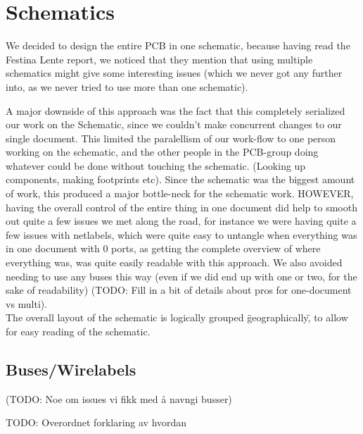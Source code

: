 \section {Schematics}

We decided to design the entire PCB in one schematic, because having read
the Festina Lente report, we noticed that they mention that using multiple schematics
might give some interesting issues (which we never got any further into,
as we never tried to use more than one schematic).

A major downside of this approach was the fact that this completely serialized our
work on the Schematic, since we couldn't make concurrent changes to our single document.
This limited the paralellism of our work-flow to one person working on the schematic,
and the other people in the PCB-group doing whatever could be done without touching the schematic.
(Looking up components, making footprints etc). Since the schematic was the biggest amount
of work, this produced a major bottle-neck for the schematic work. HOWEVER, having the overall
control of the entire thing in one document did help to smooth out quite a few issues we met
along the road, for instance we were having quite a few issues with netlabels, which were quite
easy to untangle when everything was in one document with 0 ports, as getting the complete overview
of where everything was, was quite easily readable with this approach. We also avoided needing
to use any buses this way (even if we did end up with one or two, for the sake of readability)
(TODO: Fill in a bit of details about pros for one-document vs multi). \\

The overall layout of the schematic is logically grouped \"geographically\", to
allow for easy reading of the schematic.

\subsection {Buses/Wirelabels}
(TODO: Noe om issues vi fikk med å navngi busser)

TODO: Overordnet forklaring av hvordan
